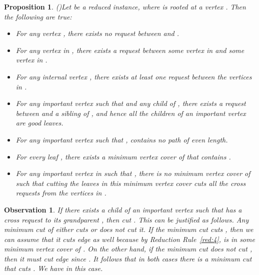 \documentclass[11pt]{article}
\newtheorem{proposition}[theorem]{Proposition}
\newtheorem{observation}[theorem]{Observation}
\begin{document}
\begin{proposition}(\cite{multicut})\label{prop:reduced}
Let  be a reduced instance, where  is rooted at a vertex . Then the following are true:

\begin{itemize}
\item[(i)] For any vertex , there exists no request between  and .

\item[(ii)] For any vertex  in , there exists a request between some vertex in  and some vertex in .

\item[(iii)] For any internal vertex , there exists at least one request between the vertices in .

\item[(iv)] For any important vertex  such that  and any child  of , there exists a request between  and a sibling of , and hence all the children of an important vertex are good leaves.

\item[(v)] For any important vertex  such that ,  contains no path of even length.

\item[(vi)] For every leaf , there exists a minimum vertex cover of  that contains .

\item[(vii)] For any important vertex  in  such that , there is no minimum vertex cover of  such that cutting the leaves in this minimum vertex cover cuts all the cross requests from the vertices in .
\end{itemize}
\end{proposition}

\begin{observation}\rm
\label{obs:000}
If there exists a child  of an important vertex  such that  has a cross request to its grandparent , then cut .
This can be justified as follows. Any minimum cut of  either cuts  or does not cut it. If the minimum cut cuts , then we can assume that it cuts edge  as well because by Reduction Rule~\ref{red:4},  is in some minimum vertex cover of . On the other hand, if the minimum cut does not cut , then it must cut edge  since . It follows that in both cases there is a minimum cut that cuts . We have  in this case.
\end{observation}
\end{document}
